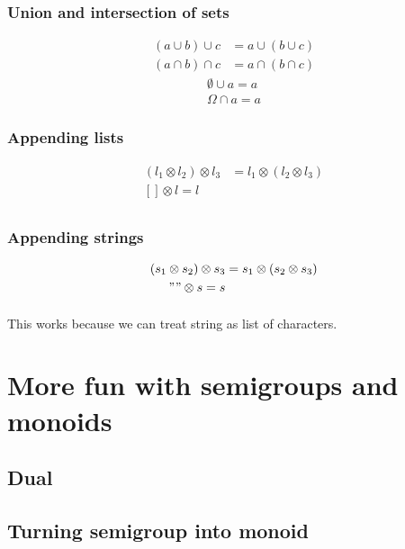 \documentclass{article}
\begin{document}
    \subsubsection{Union and intersection of sets}

    \begin{align*}
        (a \cup b) \cup c &= a \cup (b \cup c) \\
        (a \cap b) \cap c &= a \cap (b \cap c)
    \end{align*}
    \begin{align*}
        \emptyset \cup a = a \\
        \Omega    \cap a = a 
    \end{align*}

    \subsubsection{Appending lists}

    \begin{align*}
        (l_1 \otimes l_2) \otimes l_3 &= l_1 \otimes (l_2 \otimes l_3) \\
        [] \otimes l = l \\
    \end{align*}

    \subsubsection{Appending strings}

    \begin{align*}
        (s_1 \otimes s_2) \otimes s_3 &= s_1 \otimes (s_2 \otimes s_3) \\
        "" \otimes s = s \\
    \end{align*}

    \paragraph{}
    This works because we can treat string as list of characters.

    \section{More fun with semigroups and monoids}
    \subsection{Dual}
    \subsection{Turning semigroup into monoid}
\end{document}
